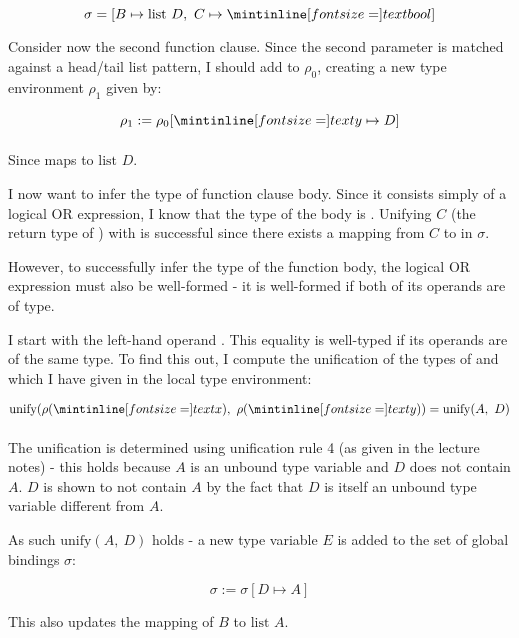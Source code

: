 $$
\sigma = [B \mapsto \text{list } D,\ C \mapsto \ms{bool}]
$$

Consider now the second function clause. Since the second parameter is matched
against a head/tail list pattern, I should add  to $\rho_0$, creating a
new type environment $\rho_1$ given by:

\begin{align*}
  \rho_1 := \rho_0[\ms{y} \mapsto D]\\[4pt]
\end{align*}

Since  maps to $\text{list } D$.

\medskip

I now want to infer the type of function clause body. Since it consists simply
of a logical OR expression, I know that the type of the body is .
Unifying $C$ (the return type of ) with  is successful since
there exists a mapping from $C$ to  in $\sigma$.

\medskip

However, to successfully infer the type of the function body, the logical OR
expression must also be well-formed - it is well-formed if both of its operands
are of  type.

\medskip

I start with the left-hand operand . This equality is well-typed if
its operands are of the same type. To find this out, I compute the unification
of the types of  and  which I have given in the local type
environment:

\begin{align*}
  \text{unify}(\rho(\ms{x}),\ \rho(\ms{y})) &= \text{unify}(A,\ D)\\[4pt]
\end{align*}

The unification is determined using unification rule 4 (as given in the lecture
notes) - this holds because $A$ is an unbound type variable and $D$ does not
contain $A$. $D$ is shown to not contain $A$ by the fact that $D$ is itself an
unbound type variable different from $A$.

\medskip

As such $\text{unify}(A,\ D)$ holds - a new type variable $E$ is added to the
set of global bindings $\sigma$:

$$
\sigma := \sigma[D \mapsto A]
$$

This also updates the mapping of $B$ to $\text{list } A$.

